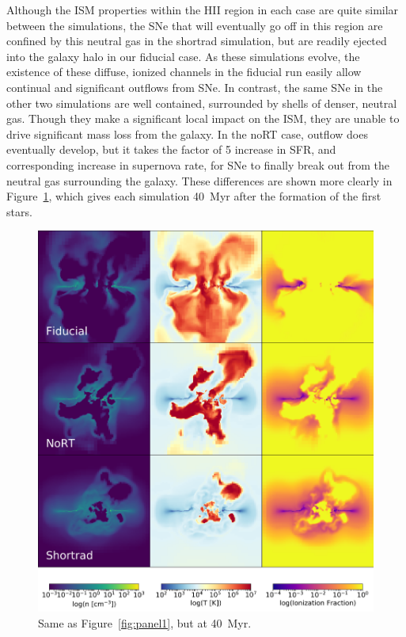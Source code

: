 \documentclass[twocolumn]{aastex62}
\begin{document}
Although the ISM properties within the HII region in each case are quite similar between the simulations, the SNe that will eventually go off in this region are confined by this neutral gas in the shortrad simulation, but are readily ejected into the galaxy halo in our fiducial case. As these simulations evolve, the existence of these diffuse, ionized channels in the fiducial run easily allow continual and significant outflows from SNe. In contrast, the same SNe in the other two simulations are well contained, surrounded by shells of denser, neutral gas. Though they make a significant local impact on the ISM, they are unable to drive significant mass loss from the galaxy. In the noRT case, outflow does eventually develop, but it takes the factor of 5 increase in SFR, and corresponding increase in supernova rate, for SNe to finally break out from the neutral gas surrounding the galaxy. These differences are shown more clearly in Figure~\ref{fig:panel2}, which gives each simulation 40~Myr after the formation of the first stars. 

\begin{figure}
\centering
\includegraphics[width=0.99\linewidth]{DD0160_fiducial_shortrad_nort}
\caption{Same as Figure~\ref{fig:panel1}, but at 40~Myr.}
\label{fig:panel2}
\end{figure}
\end{document}

